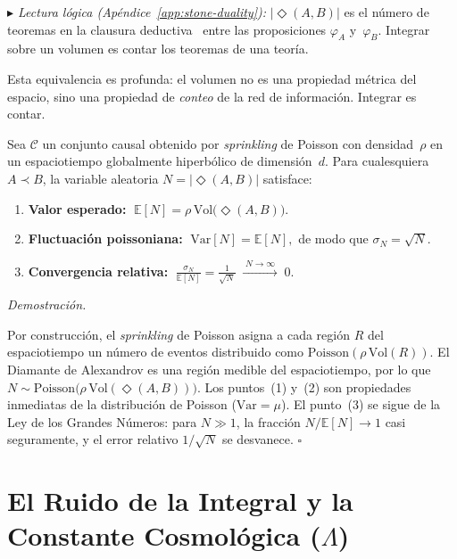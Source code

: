 \documentclass[11pt, a4paper, openany]{book}
\newcommand{\diam}[2]{\Diamond(#1,#2)}
\newcommand{\stoneref}[1]{%
  \smallskip\noindent
  {\small\color{structure!70}\textit{$\blacktriangleright$ Lectura
  l\'ogica (Ap\'endice~\ref{app:stone-duality}):} #1}%
  \smallskip}
\renewenvironment{proof}[1][Demostraci\'on]{%
  \par\noindent\textit{#1.}\quad
}{\hfill$\square$\par\medskip}
\begin{document}
\stoneref{$|\diam{A}{B}|$ es el n\'umero de teoremas en la clausura
deductiva~\cite{tarski1930} entre las proposiciones $\varphi_A$
y~$\varphi_B$. Integrar sobre un volumen es contar los teoremas de
una teor\'ia.}

\noindent
Esta equivalencia es profunda: el volumen no es una propiedad
m\'etrica del espacio, sino una propiedad de \emph{conteo} de la
red de informaci\'on. Integrar es contar.

\begin{theorem}
\label{thm:volume-convergence}
Sea $\mathcal{C}$ un conjunto causal obtenido por \emph{sprinkling}
de Poisson con densidad~$\rho$ en un espaciotiempo globalmente
hiperb\'olico de dimensi\'on~$d$. Para cualesquiera $A \prec B$, la
variable aleatoria $N = |\diam{A}{B}|$ satisface:
\begin{enumerate}
  \item \textbf{Valor esperado:}
    $\;\mathbb{E}[N] = \rho\,\mathrm{Vol}\bigl(\diam{A}{B}\bigr).$
  \item \textbf{Fluctuaci\'on poissoniana:}
    $\;\mathrm{Var}[N] = \mathbb{E}[N],$
    de modo que $\sigma_N = \sqrt{N}$.
  \item \textbf{Convergencia relativa:}
    $\;\displaystyle\frac{\sigma_N}{\mathbb{E}[N]}
    = \frac{1}{\sqrt{N}}
    \;\xrightarrow{\;N \to \infty\;}\; 0.$
\end{enumerate}
\end{theorem}

\begin{proof}
Por construcci\'on, el \emph{sprinkling} de Poisson asigna a cada
regi\'on $R$ del espaciotiempo un n\'umero de eventos distribuido como
$\mathrm{Poisson}(\rho\,\mathrm{Vol}(R))$. El Diamante de Alexandrov
es una regi\'on medible del espaciotiempo, por lo que
$N \sim \mathrm{Poisson}\bigl(\rho\,\mathrm{Vol}(\diam{A}{B})\bigr)$.
Los puntos~(1) y~(2) son propiedades inmediatas de la distribuci\'on
de Poisson ($\mathrm{Var} = \mu$). El punto~(3) se sigue de la Ley
de los Grandes N\'umeros: para $N \gg 1$, la fracci\'on
$N/\mathbb{E}[N] \to 1$ casi seguramente, y el error relativo
$1/\sqrt{N}$ se desvanece.
\end{proof}

\section{El Ruido de la Integral y la Constante Cosmol\'ogica ($\Lambda$)}
\end{document}
